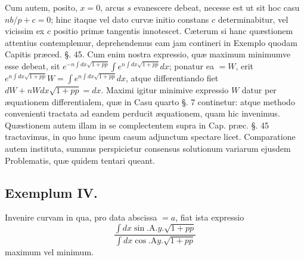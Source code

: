 Cum autem, posito, $x=0$, arcus $s$ evanescere debeat, necesse est ut sit hoc casu $nb/p+c=0$; hinc itaque vel dato curvæ initio constans $c$ determinabitur, vel vicissim ex $c$ positio primæ tangentis innotescet. Cæterum si hanc quæstionem attentius contemplemur, deprehendemus eam jam contineri in Exemplo quodam Capitis præced. §. 45. Cum enim nostra expressio, quæ maximum minimumve esse debeat, sit $e^{-n\int dx\sqrt{1+pp}}\int e^{n\int dx\sqrt{1+pp}}dx$; ponatur ea $=W$, erit $e^{n\int dx\sqrt{1+pp}}W=\int e^{n\int dx\sqrt{1+pp}}dx$, atque differentiando fiet $dW+nWdx\sqrt{1+pp}=dx$. Maximi igitur minimive expressio $W$ datur per æquationem differentialem, quæ in Casu quarto §. 7 continetur: atque methodo convenienti tractata ad eandem perducit æquationem, quam hic invenimus. Quæstionem autem illam in se complectentem supra in Cap. præc. §. 45 tractavimus, in quo hunc ipsum casum adjunctum spectare licet. Comparatione autem instituta, summus perspicietur consensus solutionum variarum ejusdem Problematis, quæ quidem tentari queant.
\subsection*{Exemplum IV.}
Invenire curvam in qua, pro data abscissa $=a$, fiat ista expressio
\[\frac{\int dx\sin.\mathrm{A}.y.\sqrt{1+pp}}{\int dx\cos.\mathrm{A}y.\sqrt{1+pp}}\]
maximum vel minimum.

